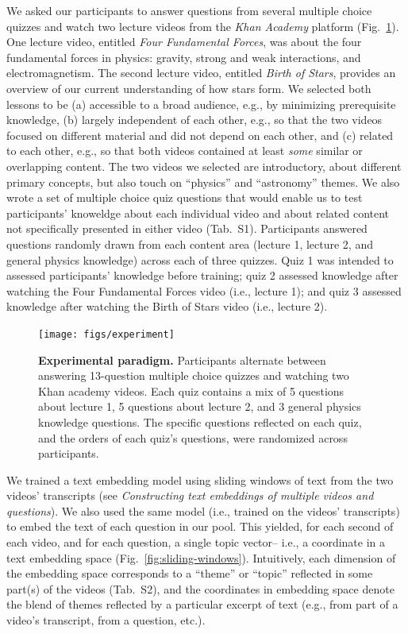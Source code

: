 \documentclass[10pt]{article}
\newcommand{\questions}{S1}
\newcommand{\topics}{S2}
\begin{document}
We asked our participants to answer questions from several multiple choice
quizzes and watch two lecture videos from the \textit{Khan Academy} platform
(Fig.~\ref{fig:experiment}). One lecture video, entitled \textit{Four
Fundamental Forces}, was about the four fundamental forces in physics: gravity,
strong and weak interactions, and electromagnetism. The second lecture video,
entitled \textit{Birth of Stars}, provides an overview of our current
understanding of how stars form. We selected both lessons to be (a) accessible
to a broad audience, e.g., by minimizing prerequisite knowledge, (b) largely
independent of each other, e.g., so that the two videos focused on different
material and did not depend on each other, and (c) related to each other, e.g.,
so that both videos contained at least \textit{some} similar or overlapping
content. The two videos we selected are introductory, about different primary
concepts, but also touch on ``physics'' and ``astronomy'' themes. We also wrote
a set of multiple choice quiz questions that would enable us to test
participants' knoweldge about each individual video and about related content
not specifically presented in either video (Tab.~\questions). Participants
answered questions randomly drawn from each content area (lecture 1, lecture 2,
and general physics knowledge) across each of three quizzes. Quiz 1 was
intended to assessed participants' knowledge before training; quiz 2 assessed
knowledge after watching the Four Fundamental Forces video (i.e., lecture 1);
and quiz 3 assessed knowledge after watching the Birth of Stars video (i.e.,
lecture 2).

\begin{figure}[tp]
    \centering
    \texttt{[image: figs/experiment]}
    
    \caption{\textbf{Experimental paradigm.} Participants alternate between
    answering 13-question multiple choice quizzes and watching two Khan academy
    videos. Each quiz contains a mix of 5 questions about lecture 1, 5
    questions about lecture 2, and 3 general physics knowledge questions. The
    specific questions reflected on each quiz, and the orders of each quiz's
    questions, were randomized across participants.}
    
    \label{fig:experiment}
\end{figure}

We trained a text embedding model using sliding windows of text from the two
videos' transcripts (see \textit{Constructing text embeddings of multiple
videos and questions}). We also used the same model (i.e., trained on the
videos' transcripts) to embed the text of each question in our pool. This
yielded, for each second of each video, and for each question, a single topic
vector-- i.e., a coordinate in a text embedding space
(Fig.~\ref{fig:sliding-windows}). Intuitively, each dimension of the embedding
space corresponds to a ``theme'' or ``topic'' reflected in some part(s) of the
videos (Tab.~\topics), and the coordinates in embedding space denote the blend
of themes reflected by a particular excerpt of text (e.g., from part of a
video's transcript, from a question, etc.).
\end{document}
